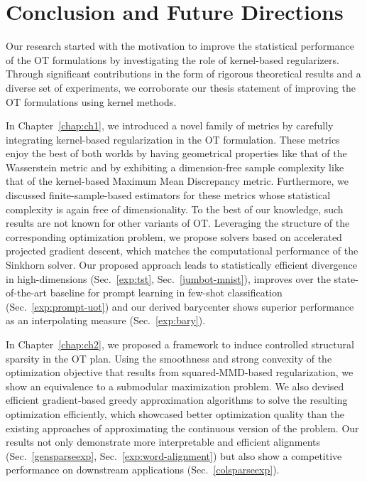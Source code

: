 \chapter{Conclusion and Future Directions}\label{chap:conclude}
Our research started with the motivation to improve the statistical performance of the OT formulations by investigating the role of kernel-based regularizers. Through significant contributions in the form of rigorous theoretical results and a diverse set of experiments, we corroborate our thesis statement of improving the OT formulations using kernel methods.

In Chapter~\ref{chap:ch1}, we introduced a novel family of metrics by carefully integrating kernel-based regularization in the OT formulation. These metrics enjoy the best of both worlds by having geometrical properties like that of the Wasserstein metric and by exhibiting a dimension-free sample complexity like that of the kernel-based Maximum Mean Discrepancy metric. Furthermore, we discussed finite-sample-based estimators for these metrics whose statistical complexity is again free of dimensionality. To the best of our knowledge, such results are not known for other variants of OT. Leveraging the structure of the corresponding optimization problem, we propose solvers based on accelerated projected gradient descent, which matches the computational performance of the Sinkhorn solver. Our proposed approach leads to statistically efficient divergence in high-dimensions (Sec.~\ref{exp:tst}, Sec.~\ref{jumbot-mnist}), improves over the state-of-the-art baseline for prompt learning in few-shot classification (Sec.~\ref{exp:prompt-uot}) and our derived barycenter shows superior performance as an interpolating measure (Sec.~\ref{exp:bary}).

In Chapter~\ref{chap:ch2}, we proposed a framework to induce controlled structural sparsity in the OT plan. Using the smoothness and strong convexity of the optimization objective that results from squared-MMD-based regularization, we show an equivalence to a submodular maximization problem. We also devised efficient gradient-based greedy approximation algorithms to solve the resulting optimization efficiently, which showcased better optimization quality than the existing approaches of approximating the continuous version of the problem. Our results not only demonstrate more interpretable and efficient alignments (Sec.~\ref{gensparseexp}, Sec.~\ref{exp:word-alignment}) but also show a competitive performance on downstream applications (Sec.~\ref{colsparseexp}).

